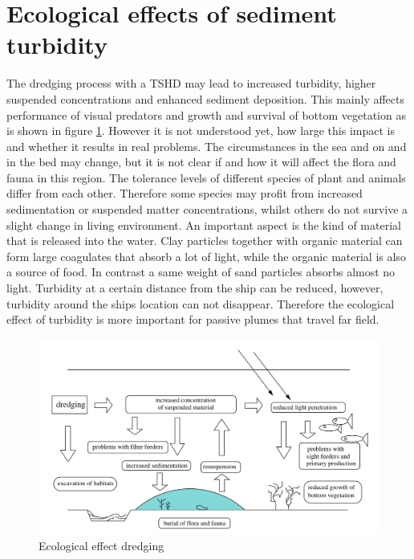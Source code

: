 \section{Ecological effects of sediment turbidity}
The dredging process with a TSHD may lead to increased turbidity, higher suspended concentrations and enhanced sediment deposition. This mainly affects performance of visual predators and growth and survival of bottom vegetation as is shown in figure \ref{fig:Ecoligical}. However it is not understood yet, how large this impact is and whether it results in real problems. The circumstances in the sea and on and in the bed may change, but it is not clear if and how it will affect the flora and fauna in this region. The tolerance levels of different species of plant and animals differ from each other. Therefore some species may profit from increased sedimentation or suspended matter concentrations, whilst others do not survive a slight change in living environment. An important aspect is the kind of material that is released into the water. Clay particles together with organic material can form large coagulates that absorb a lot of light, while the organic material is also a source of food. In contrast a same weight of sand particles absorbs almost no light. \citep{Dankers} \newline
Turbidity at a certain distance from the ship can be reduced, however, turbidity around the ships location can not disappear. Therefore the ecological effect of turbidity is more important for passive plumes that travel far field.

\begin{figure}[ht!]
    \centering
    \includegraphics[width=.75\linewidth]{Images/Ecological.png}
    \caption{Ecological effect dredging}
    \label{fig:Ecoligical}
\end{figure}


